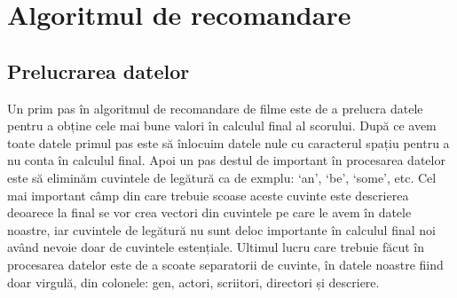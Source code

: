 \chapter{Algoritmul de recomandare }
\label{chap:ch1}

\section{Prelucrarea datelor}
\label{sec:ch3sec1}
\par Un prim pas în algoritmul de recomandare de filme este de a prelucra datele pentru a obține cele mai bune valori în calculul final al scorului. După ce avem toate datele primul pas este să înlocuim datele nule cu caracterul spațiu pentru a nu conta în calculul final. Apoi un pas destul de important în procesarea datelor este să eliminăm cuvintele de legătură ca de exmplu: ‘an’, ‘be’, ‘some’, etc. Cel mai important câmp din care trebuie scoase aceste cuvinte este descrierea deoarece la final se vor crea vectori din cuvintele pe care le avem în datele noastre, iar cuvintele de legătură nu sunt deloc importante în calculul final noi având nevoie doar de cuvintele estențiale. Ultimul lucru care trebuie făcut în procesarea datelor este de a scoate separatorii de cuvinte, în datele noastre fiind doar virgulă, din colonele: gen, actori, scriitori, directori și descriere.
